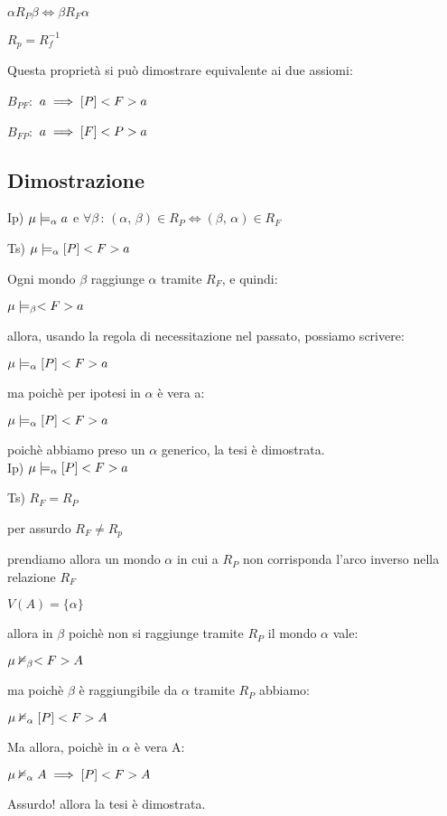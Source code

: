 $\alpha R_{P}\beta\iff\beta R_{F}\alpha$

$R_{p}=R_{f}^{-1}$

Questa proprietà si può dimostrare equivalente ai due assiomi:

$B_{PF}:$ $a\implies[P]<F>a$

$B_{FP}:$ $a\implies[F]<P>a$


\subsection{Dimostrazione}

Ip) $\mu\models_{\alpha}a$ e $\forall\beta\,:\,(\alpha,\,\beta)\in R_{P}\iff(\beta,\,\alpha)\in R_{F}$

Ts) $\mu\models_{\alpha}[P]<F>a$

Ogni mondo $\beta$ raggiunge $\alpha$ tramite $R_{F}$, e quindi:

$\mu\models_{\beta}<F>a$

allora, usando la regola di necessitazione nel passato, possiamo scrivere:

$\mu\models_{\alpha}[P]<F>a$

ma poichè per ipotesi in $\alpha$ è vera a:

$\mu\models_{\alpha}[P]<F>a$

poichè abbiamo preso un $\alpha$ generico, la tesi è dimostrata.\\
Ip) $\mu\models_{\alpha}[P]<F>a$

Ts) $R_{F}=R_{P}$

per assurdo $R_{F}\neq R_{p}$

prendiamo allora un mondo $\alpha$ in cui a $R_{P}$ non corrisponda
l'arco inverso nella relazione $R_{F}$

$V(A)=\{\alpha\}$

allora in $\beta$ poichè non si raggiunge tramite $R_{P}$ il mondo
$\alpha$ vale:

$\mu\nvDash_{\beta}<F>A$

ma poichè $\beta$ è raggiungibile da $\alpha$ tramite $R_{P}$ abbiamo:

$\mu\nvDash_{\alpha}[P]<F>A$

Ma allora, poichè in $\alpha$ è vera A:

$\mu\nvDash_{\alpha}A\implies[P]<F>A$

Assurdo! allora la tesi è dimostrata.

